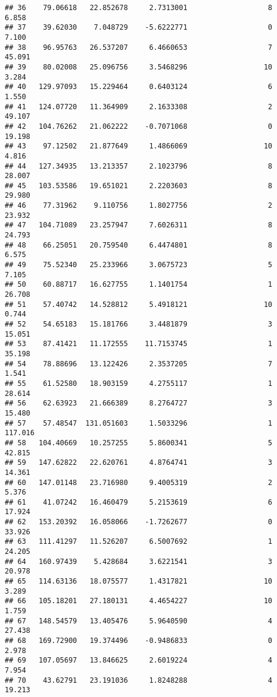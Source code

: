 \documentclass[]{article}
\begin{document}
\begin{verbatim}
## 36    79.06618   22.852678     2.7313001                   8      6.858
## 37    39.62030    7.048729    -5.6222771                   0      7.100
## 38    96.95763   26.537207     6.4660653                   7     45.091
## 39    80.02008   25.096756     3.5468296                  10      3.284
## 40   129.97093   15.229464     0.6403124                   6      1.550
## 41   124.07720   11.364909     2.1633308                   2     49.107
## 42   104.76262   21.062222    -0.7071068                   0     19.198
## 43    97.12502   21.877649     1.4866069                  10      4.816
## 44   127.34935   13.213357     2.1023796                   8     28.007
## 45   103.53586   19.651021     2.2203603                   8     29.980
## 46    77.31962    9.110756     1.8027756                   2     23.932
## 47   104.71089   23.257947     7.6026311                   8     24.793
## 48    66.25051   20.759540     6.4474801                   8      6.575
## 49    75.52340   25.233966     3.0675723                   5      7.105
## 50    60.88717   16.627755     1.1401754                   1     26.708
## 51    57.40742   14.528812     5.4918121                  10      0.744
## 52    54.65183   15.181766     3.4481879                   3     15.051
## 53    87.41421   11.172555    11.7153745                   1     35.198
## 54    78.88696   13.122426     2.3537205                   7      1.541
## 55    61.52580   18.903159     4.2755117                   1     28.614
## 56    62.63923   21.666389     8.2764727                   3     15.480
## 57    57.48547  131.051603     1.5033296                   1    117.016
## 58   104.40669   10.257255     5.8600341                   5     42.815
## 59   147.62822   22.620761     4.8764741                   3     14.361
## 60   147.01148   23.716980     9.4005319                   2      5.376
## 61    41.07242   16.460479     5.2153619                   6     17.924
## 62   153.20392   16.058066    -1.7262677                   0     33.926
## 63   111.41297   11.526207     6.5007692                   1     24.205
## 64   160.97439    5.428684     3.6221541                   3     20.978
## 65   114.63136   18.075577     1.4317821                  10      3.289
## 66   105.18201   27.180131     4.4654227                  10      1.759
## 67   148.54579   13.405476     5.9640590                   4     27.438
## 68   169.72900   19.374496    -0.9486833                   0      2.978
## 69   107.05697   13.846625     2.6019224                   4      7.954
## 70    43.62791   23.191036     1.8248288                   4     19.213

\end{verbatim}
\end{document}
